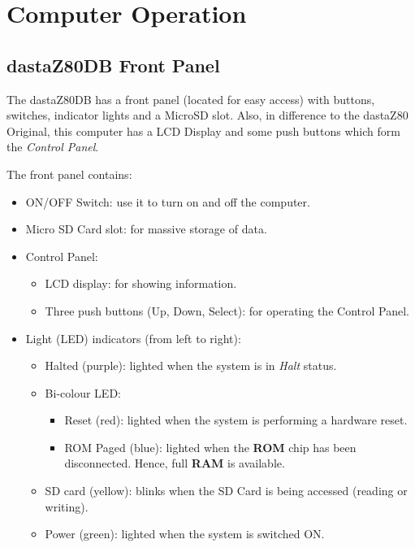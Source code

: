 \section{Computer Operation}
    
    \subsection{dastaZ80DB Front Panel}
    \label{subsec:frontpanel}

    The dastaZ80DB has a front panel (located for easy access) with buttons,
    switches, indicator lights and a MicroSD slot. Also, in difference to the
    dastaZ80 Original, this computer has a LCD Display and some push buttons
    which form the \textit{Control Panel}.

    The front panel contains:

    \begin{itemize}
        \item ON/OFF Switch: use it to turn on and off the computer.
        \item Micro SD Card slot: for massive storage of data.
        \item Control Panel:
            \begin{itemize}
                \item LCD display: for showing information.
                \item Three push buttons (Up, Down, Select): for operating the
                    Control Panel.
            \end{itemize}
        \item Light (LED) indicators (from left to right):
            \begin{itemize}
                \item Halted (purple): lighted when the system is in \textit{Halt}
                    status.
                \item Bi-colour LED:
                    \begin{itemize}
                        \item Reset (red): lighted when the system is performing
                            a hardware reset.
                        \item ROM Paged (blue): lighted when the \textbf{ROM}
                            chip has been disconnected. Hence, full \textbf{RAM}
                            is available.
                    \end{itemize}
                \item SD card (yellow): blinks when the SD Card is being
                    accessed (reading or writing).
                \item Power (green): lighted when the system is switched ON.
            \end{itemize}
    \end{itemize}

